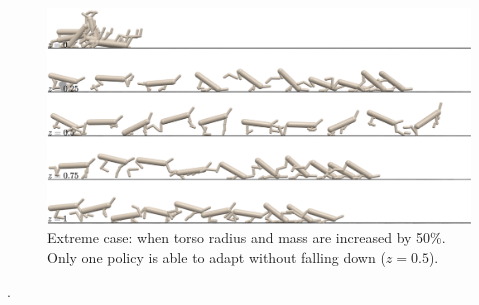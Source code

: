 \vspace{5cm}

\begin{figure}[t]
        \begin{center}
        \includegraphics[width=1.\linewidth]{images/hugetorso.png}
        \caption{Extreme case: when torso radius and mass are increased by 50\%. Only one policy is able to adapt without falling down ($z=0.5$).}
        \label{fig:hugetorso}
        \end{center}
\end{figure}


.

\newpage

